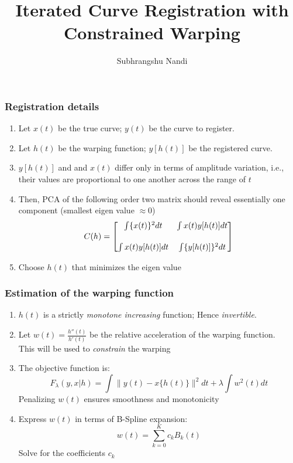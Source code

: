 \documentclass[10pt,dvipsnames,table]{beamer}
\title[Curve Registration (constrained warping)]{Iterated Curve Registration with Constrained Warping}
\author{Subhrangshu Nandi}
\begin{document}
\setlength{\baselineskip}{16truept}
\frame{\maketitle}


\begin{frame}
\frametitle{Registration details}
\begin{enumerate}
\item Let $x(t)$ be the true curve; $y(t)$ be the curve to register. 
\item Let $h(t)$ be the warping function; $y[h(t)]$ be the registered curve.
\item $y[h(t)]$ and and $x(t)$ differ only in terms of amplitude variation, i.e., their values are proportional to one another across the range of $t$
\item Then, PCA of the following order two matrix should reveal essentially one component (smallest eigen value $\approx 0$) \\
\[C(h) = 
\begin{bmatrix}
\int \{x(t) \}^2dt & \int x(t) y[h(t)]dt \vspace{0.5cm} \\ 
\int x(t) y[h(t)]dt & \int \{y[h(t)]\}^2dt
\end{bmatrix}
\]
\item Choose $h(t)$ that minimizes the eigen value
\end{enumerate}
\end{frame}

\begin{frame}
\frametitle{Estimation of the warping function}
\begin{enumerate}
\item $h(t)$ is a strictly {\emph{monotone increasing}} function; Hence {\emph{invertible}}.
\item Let $w(t) = \frac{h''(t)}{h'(t)}$ be the relative acceleration of the warping function. \\
This will be used to {\emph{constrain}} the warping
\item The objective function is:
\[ F_{\lambda}(y,x|h) = \int \|y(t) - x\{h(t)\} \|^2 dt + \lambda \int w^2(t) dt \]
Penalizing $w(t)$ ensures smoothness and monotonicity
\item Express $w(t)$ in terms of B-Spline expansion: 
\[w(t) = \sum \limits_{k=0}^{K} c_k B_k(t)\]
Solve for the coefficients $c_k$
\end{enumerate}
\end{frame}
\end{document}
